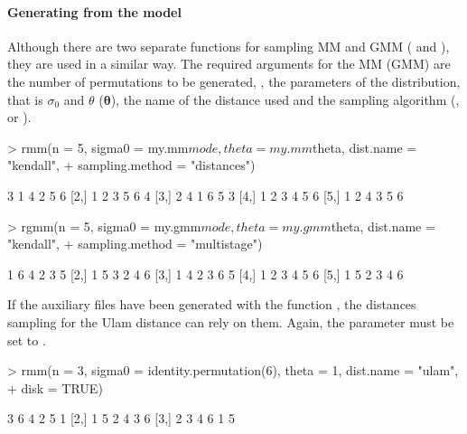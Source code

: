 \documentclass[article,nojss]{jss}
\begin{document}
\paragraph{Generating from the model}
Although there are two separate functions for sampling MM and GMM ( and ), they are used in a similar way. The required arguments for the MM (GMM) are the number of permutations to be generated, , the parameters of the distribution, that is $\sigma_0$ and $\theta$ ($\boldsymbol\theta$), the name of the distance used and the sampling algorithm (,  or ).
\begin{Schunk}
\begin{Sinput}
> rmm(n = 5, sigma0 = my.mm$mode, theta = my.mm$theta, dist.name = "kendall", 
+     sampling.method = "distances")
\end{Sinput}
\begin{Soutput}
     [,1] [,2] [,3] [,4] [,5] [,6]
[1,]    3    1    4    2    5    6
[2,]    1    2    3    5    6    4
[3,]    2    4    1    6    5    3
[4,]    1    2    3    4    5    6
[5,]    1    2    4    3    5    6
\end{Soutput}
\begin{Sinput}
> rgmm(n = 5, sigma0 = my.gmm$mode, theta = my.gmm$theta, dist.name = "kendall", 
+     sampling.method = "multistage")
\end{Sinput}
\begin{Soutput}
     [,1] [,2] [,3] [,4] [,5] [,6]
[1,]    1    6    4    2    3    5
[2,]    1    5    3    2    4    6
[3,]    1    4    2    3    6    5
[4,]    1    2    3    4    5    6
[5,]    1    5    2    3    4    6
\end{Soutput}
\end{Schunk}

If the auxiliary files have been generated with the function , the distances sampling for the Ulam distance can rely on them. Again, the  parameter must be set to .

\begin{Schunk}
\begin{Sinput}
> rmm(n = 3, sigma0 = identity.permutation(6), theta = 1, dist.name = "ulam", 
+     disk = TRUE)
\end{Sinput}
\begin{Soutput}
     [,1] [,2] [,3] [,4] [,5] [,6]
[1,]    3    6    4    2    5    1
[2,]    1    5    2    4    3    6
[3,]    2    3    4    6    1    5
\end{Soutput}
\end{Schunk}
\end{document}
